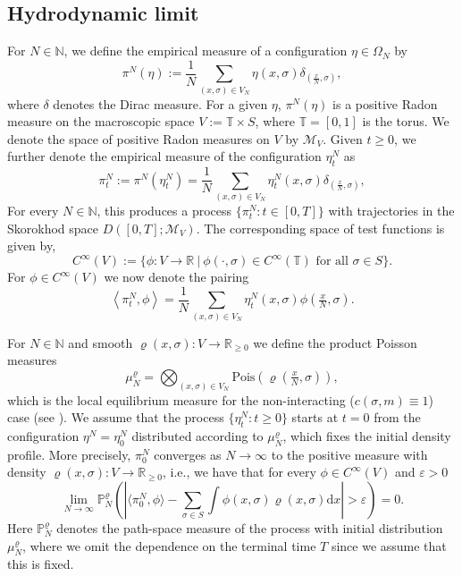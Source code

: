 \documentclass[11pt]{article}
\numberwithin{equation}{section}
\theoremstyle{definition}
\theoremstyle{plain}
\newcommand{\p}{\mathbb{P}}
\newcommand{\dd}{\mathrm{d}}
\begin{document}
\subsection{Hydrodynamic limit}\label{hydro section}
For $N\in\mathbb{N}$, we define the empirical measure of a configuration $\eta\in \Omega_N$ by
    \begin{equation}\label{emp meas}
        \pi^N(\eta) := \frac{1}{N} \sum_{(x,\sigma)\in V_N} \eta(x,\sigma) \delta_{(\frac{x}{N},\sigma)},
    \end{equation}
where $\delta$ denotes the Dirac measure. For a given $\eta$, $\pi^N(\eta)$ is a positive Radon measure on the macroscopic space $V:=\mathbb{T}\times S$, where  $\mathbb{T} = [0,1]$ is the torus. We denote the space of positive Radon measures on $V$ by $\mathcal{M}_V$. 
Given $t\geq 0$, we further denote the empirical measure of the configuration $\eta^N_t$ as 
    \begin{equation}
        \pi^N_{t} := \pi^N(\eta_t^N) = \frac{1}{N} \sum_{(x,\sigma)\in V_N} \eta_t^N(x,\sigma)\delta_{(\tfrac{x}{N},\sigma)},
    \end{equation}
 For every $N\in\mathbb{N}$, this produces a process 
 $\{\pi^N_{t}:t\in [0,T]\}$ with trajectories in the Skorokhod space $D([0,T];\mathcal{M}_V)$. The corresponding space of test functions is given by,
    \begin{equation}
        C^\infty(V) := \{\phi :V\to \mathbb{R}\ \big|\ \phi(\cdot,\sigma) \in C^\infty(\mathbb{T}) \text{ for all $\sigma \in S$}\}.
    \end{equation}
For $\phi \in C^\infty(V)$ we now denote the pairing
    \begin{equation}
        \left< \pi^N_{t}, \phi\right> = \frac{1}{N} \sum_{(x,\sigma)\in V_N}\eta_t^N(x,\sigma) \phi(\tfrac{x}{N},\sigma).
    \end{equation}

For $N\in\mathbb{N}$ and  smooth $\varrho(x,\sigma):V\to\mathbb{R}_{\geq 0}$  we define the product Poisson measures 
    \begin{equation}\label{poissonini}
        \mu_N^{\varrho} = \bigotimes_{(x,\sigma) \in V_N} \mathrm{Pois}(\varrho\left(\tfrac{x}N,\sigma\right)), 
    \end{equation}
which is the local equilibrium measure for the non-interacting ($c(\sigma,m)\equiv1$) case  (see \cite{hidde-ergodic}). We assume that the process $\{\eta^N_t:t\geq0\}$ starts at $t=0$ from the configuration $\eta^N= \eta^N_0$ distributed according to $\mu_N^{\varrho}$, which fixes the initial density profile. More precisely, $\pi^N_{0}$ converges as $N\to\infty$ to the positive measure with density $\varrho(x,\sigma):V\to\mathbb{R}_{\geq 0}$, i.e., we have that for every $\phi \in C^\infty(V)$ and $\varepsilon>0$
    \begin{equation}
        \lim_{N\to\infty} \p_{N}^{\varrho}\left(\left|\langle \pi^N_{0},\phi\rangle - \sum_{\sigma \in S} \int \phi(x,\sigma)\varrho(x,\sigma)\dd x\right|>\varepsilon\right) = 0.
    \end{equation}
Here $\p_{N}^{\varrho}$ denotes the path-space measure of the process with initial distribution $\mu_N^{\varrho}$, where we omit the dependence on the terminal time $T$ since we assume that this is fixed. 
\end{document}
